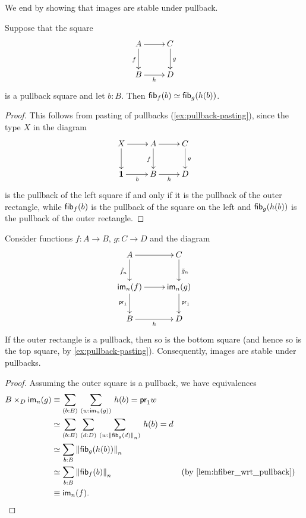 We end by showing that images are stable under pullback.

\begin{lem}\label{lem:hfiber_wrt_pullback}
Suppose that the square
\begin{equation*}
  \vcenter{\xymatrix{
      A\ar[r]\ar[d]_f &
      C\ar[d]^g\\
      B\ar[r]_-h &
      D
      }}
\end{equation*}
is a pullback square and let $b:B$. Then ${\mathsf{fib}}_{f}(b)\simeq{\mathsf{fib}}_{g}(h(b))$.
\end{lem}

\begin{proof}
This follows from pasting of pullbacks (\cref{ex:pullback-pasting}), since the type $X$ in the diagram
\begin{equation*}
  \vcenter{\xymatrix{
      X\ar[r]\ar[d] &
      A\ar[r]\ar[d]_f &
      C\ar[d]^g\\
      \unit\ar[r]_b &
      B\ar[r]_h &
      D
      }}
\end{equation*}
is the pullback of the left square if and only if it is the pullback of the outer rectangle, while ${\mathsf{fib}}_{f}(b)$ is the pullback of the square on the left and ${\mathsf{fib}}_{g}(h(b))$ is the pullback of the outer rectangle.
\end{proof}

\begin{thm}\label{thm:stable-images}
%
Consider functions $f:A\to B$, $g:C\to D$ and the diagram
\begin{equation*}
  \vcenter{\xymatrix{
      A\ar[r]\ar[d]_{\tilde{f}_n} &
      C\ar[d]^{\tilde{g}_n}\\
      \im_n(f)\ar[r]\ar[d]_{\proj1} &
      \im_n(g)\ar[d]^{\proj1}\\
      B\ar[r]_h &
      D
      }}
\end{equation*}
If the outer rectangle is a pullback, then so is the bottom square (and hence so is the top square, by \cref{ex:pullback-pasting}). Consequently, images are stable under pullbacks.
\end{thm}

\begin{proof}
Assuming the outer square is a pullback, we have equivalences
\begin{align*}
B\times_D\im_n(g) & \jdeq \sm{b:B}{w:\im_n(g)} h(b)=\proj1 w\\
& \eqvsym \sm{b:B}{d:D}{w:\trunc n{\hfib{g}d}} h(b)= d\\
& \eqvsym \sm{b:B} \trunc n{\hfib{g}{h(b)}}\\
& \eqvsym \sm{b:B} \trunc n{\hfib{f}b} &&
\text{(by \cref{lem:hfiber_wrt_pullback})}\\
& \equiv \im_n(f). && \qedhere
\end{align*}
\end{proof}

